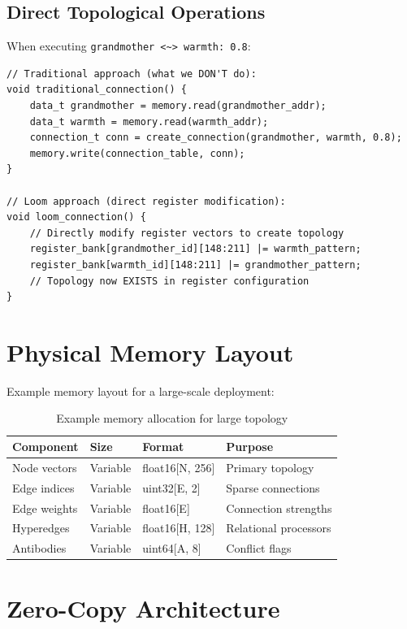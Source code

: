 \documentclass[12pt,a4paper,openany]{book} %
\begin{document}
\subsection{Direct Topological Operations}

When executing \texttt{grandmother <\textasciitilde{}> warmth: 0.8}:

\begin{lstlisting}[style=cpp]
// Traditional approach (what we DON'T do):
void traditional_connection() {
    data_t grandmother = memory.read(grandmother_addr);
    data_t warmth = memory.read(warmth_addr);
    connection_t conn = create_connection(grandmother, warmth, 0.8);
    memory.write(connection_table, conn);
}

// Loom approach (direct register modification):
void loom_connection() {
    // Directly modify register vectors to create topology
    register_bank[grandmother_id][148:211] |= warmth_pattern;
    register_bank[warmth_id][148:211] |= grandmother_pattern;
    // Topology now EXISTS in register configuration
}
\end{lstlisting}
\vspace{0.5em}

\section{Physical Memory Layout}

Example memory layout for a large-scale deployment:

\begin{table}[H]
\centering
\begin{tabular}{llll}
\toprule
\textbf{Component} & \textbf{Size} & \textbf{Format} & \textbf{Purpose} \\
\midrule
Node vectors & Variable & float16[N, 256] & Primary topology \\
Edge indices & Variable & uint32[E, 2] & Sparse connections \\
Edge weights & Variable & float16[E] & Connection strengths \\
Hyperedges & Variable & float16[H, 128] & Relational processors \\
Antibodies & Variable & uint64[A, 8] & Conflict flags \\
\bottomrule
\end{tabular}
\caption{Example memory allocation for large topology}
\end{table}

\section{Zero-Copy Architecture}
\end{document}
